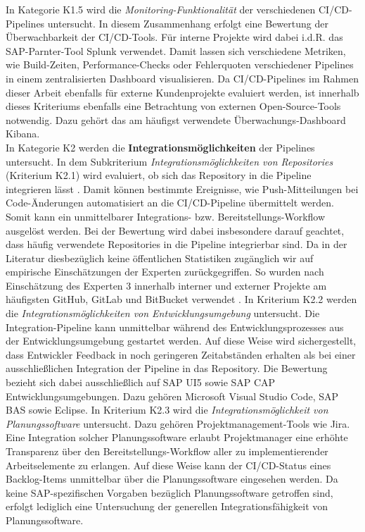 In Kategorie K1.5 wird die \textit{Monitoring-Funktionalität} der verschiedenen CI/CD-Pipelines untersucht. In diesem Zusammenhang erfolgt eine Bewertung der Überwachbarkeit der CI/CD-Tools. Für interne Projekte wird dabei i.d.R. das SAP-Parnter-Tool Splunk verwendet. Damit lassen sich verschiedene Metriken, wie Build-Zeiten, Performance-Checks oder Fehlerquoten verschiedener Pipelines in einem zentralisierten Dashboard visualisieren. Da CI/CD-Pipelines im Rahmen dieser Arbeit ebenfalls für externe Kundenprojekte evaluiert werden, ist innerhalb dieses Kriteriums ebenfalls eine Betrachtung von externen Open-Source-Tools notwendig. Dazu gehört das am häufigst verwendete Überwachungs-Dashboard Kibana.\\
In Kategorie K2 werden die \textbf{Integrationsmöglichkeiten} der Pipelines untersucht. In dem Subkriterium \textit{Integrationsmöglichkeiten von Repositories} (Kriterium K2.1) wird evaluiert, ob sich das Repository in die Pipeline integrieren lässt \cite[Z. 79]{ProductOwnerSAPBTPProd&Infra.}. Damit können bestimmte Ereignisse, wie Push-Mitteilungen bei Code-Änderungen automatisiert an die CI/CD-Pipeline übermittelt werden. Somit kann ein unmittelbarer Integrations- bzw. Bereitstellungs-Workflow ausgelöst werden. Bei der Bewertung wird dabei insbesondere darauf geachtet, dass häufig verwendete Repositories in die Pipeline integrierbar sind. Da in der Literatur diesbezüglich keine öffentlichen Statistiken zugänglich wir auf empirische Einschätzungen der Experten zurückgegriffen. So wurden nach Einschätzung des Experten 3 innerhalb interner und externer Projekte am häufigsten GitHub, GitLab und BitBucket verwendet \cite[Z. 85]{TestDeveloperSAPHyperspaceAdoption&Onboarding.}. In Kriterium K2.2 werden die \textit{Integrationsmöglichkeiten von Entwicklungsumgebung} untersucht. Die Integration-Pipeline kann unmittelbar während des Entwicklungsprozesses aus der Entwicklungsumgebung gestartet werden. Auf diese Weise wird sichergestellt, dass Entwickler Feedback in noch geringeren Zeitabständen erhalten als bei einer ausschließlichen Integration der Pipeline in das Repository. Die Bewertung bezieht sich dabei ausschließlich auf SAP UI5 sowie SAP CAP Entwicklungsumgebungen. Dazu gehören Microsoft Visual Studio Code, \ac{SAP BAS} sowie Eclipse.
In Kriterium K2.3 wird die \textit{Integrationsmöglichkeit von Planungssoftware} untersucht. Dazu gehören Projektmanagement-Tools wie Jira. Eine Integration solcher Planungssoftware erlaubt Projektmanager eine erhöhte Transparenz über den Bereitstellungs-Workflow aller zu implementierender Arbeitselemente zu erlangen. Auf diese Weise kann der CI/CD-Status eines Backlog-Items unmittelbar über die Planungssoftware eingesehen werden. Da keine SAP-spezifischen Vorgaben bezüglich Planungssoftware getroffen sind, erfolgt lediglich eine Untersuchung der generellen Integrationsfähigkeit von Planungssoftware.\\ 
